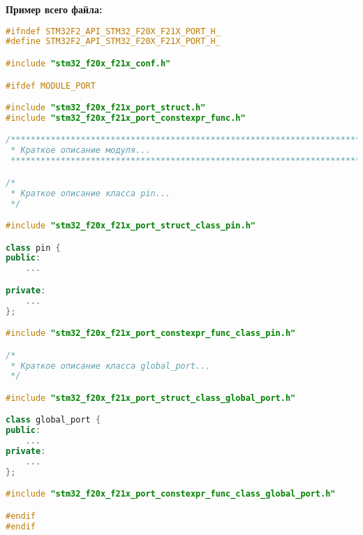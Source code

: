 \textbf{Пример всего файла:}\begin{lstlisting}[language=C++, frame=tlBR, basicstyle=\fontsize{10}{10}\ttfamily]
#ifndef STM32F2_API_STM32_F20X_F21X_PORT_H_
#define STM32F2_API_STM32_F20X_F21X_PORT_H_

#include "stm32_f20x_f21x_conf.h"

#ifdef MODULE_PORT

#include "stm32_f20x_f21x_port_struct.h"						
#include "stm32_f20x_f21x_port_constexpr_func.h"				

/**********************************************************************
 * Краткое описание модуля...
 **********************************************************************/

/*
 * Краткое описание класса pin...
 */

#include "stm32_f20x_f21x_port_struct_class_pin.h"

class pin {
public:
	...

private:
	...
};

#include "stm32_f20x_f21x_port_constexpr_func_class_pin.h"

/*
 * Краткое описание класса global_port...
 */

#include "stm32_f20x_f21x_port_struct_class_global_port.h"		

class global_port {
public:
	...
private:
	...
};

#include "stm32_f20x_f21x_port_constexpr_func_class_global_port.h"

#endif
#endif
 \end{lstlisting}

